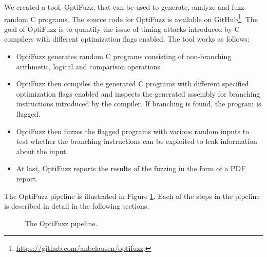 We created a tool, OptiFuzz, that can be used to generate, analyze and fuzz random C programs.
The source code for OptiFuzz is available on GitHub\footnote{\url{https://github.com/anbclausen/optifuzz}.}.
The goal of OptiFuzz is to quantify the issue of timing attacks introduced by C compilers with different optimization flags enabled.
The tool works as follows:
\begin{itemize}
  \item OptiFuzz generates random C programs consisting of non-branching arithmetic, logical and comparison operations.
  \item OptiFuzz then compiles the generated C programs with different specified optimization flags enabled and inspects the generated assembly for branching instructions introduced by the compiler.
        If branching is found, the program is flagged.
  \item OptiFuzz then fuzzes the flagged programs with various random inputs to test whether the branching instructions can be exploited to leak information about the input.
  \item At last, OptiFuzz reports the results of the fuzzing in the form of a PDF report.
\end{itemize}
The OptiFuzz pipeline is illustrated in Figure \ref{fig:optifuzz-pipeline}. 
Each of the steps in the pipeline is described in detail in the following sections.
\begin{figure}[H]
  \centering
  
  \caption{The OptiFuzz pipeline.}
  \label{fig:optifuzz-pipeline}
\end{figure}
